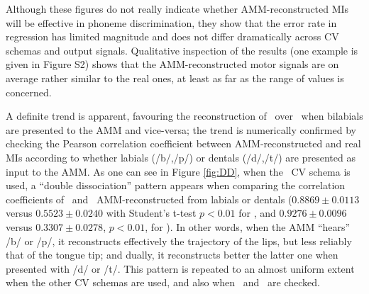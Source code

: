 Although these figures do not really indicate whether AMM-reconstructed MIs will be
effective in phoneme discrimination, they show that the error rate in regression has
limited magnitude and does not differ dramatically across CV schemas and output signals.
Qualitative inspection of the results (one example is given in Figure S2) shows that 
the AMM-reconstructed motor signals are on average rather similar to the real ones,
 at least as far as the range of values is concerned.


A definite trend is apparent, favouring the reconstruction of \vlio\ over \vttu\ when
bilabials are presented to the AMM and vice-versa; the trend is numerically confirmed
by checking the Pearson correlation coefficient between AMM-reconstructed and real MIs
according to whether labials (/b/,/p/) or dentals (/d/,/t/) are presented as input
to the AMM. As one can see in Figure \ref{fig:DD}, when the \overall\ CV schema is used,
a ``double dissociation'' pattern appears when comparing the correlation coefficients of
\vlio\ and \vttu\ AMM-reconstructed from labials or dentals
($0.8869 \pm 0.0113$ versus $0.5523 \pm 0.0240$ with Student's t-test $p<0.01$ for \vlio, and
 $0.9276 \pm 0.0096$ versus $0.3307 \pm 0.0278$, $p<0.01$, for \vttu).
In other words, when the AMM ``hears'' /b/ or /p/, it reconstructs effectively the trajectory of the lips,
but less reliably that of the tongue tip; and dually, it reconstructs better the latter one when
presented with /d/ or /t/. This pattern is repeated to an almost uniform extent when the
other CV schemas are used, and also when \alio\ and \attu\ are checked.
